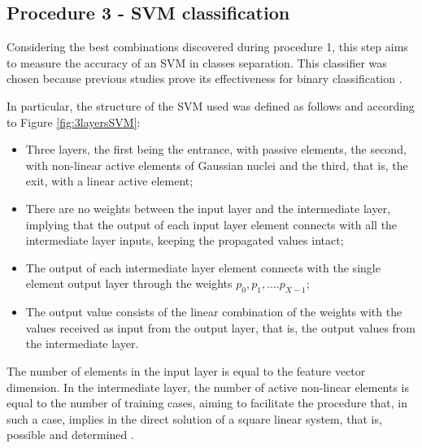 		\subsection{Procedure 3 - SVM classification}
			\label{sec:propApproach:subsec:Experiment3}

			\par Considering the best combinations discovered during procedure 1, this step aims to measure the accuracy of an SVM in classes separation. This classifier was chosen because previous studies prove its effectiveness for binary classification \cite{bennett2000support}.\\
			
			\par In particular, the structure of the SVM used was defined as follows and according to Figure \ref{fig:3layersSVM}:\\
			\begin{itemize}
				\item Three layers, the first being the entrance, with passive elements, the second, with non-linear active elements of Gaussian nuclei and the third, that is, the exit, with a linear active element;

				\item There are no weights between the input layer and the intermediate layer, implying that the output of each input layer element connects with all the intermediate layer inputs, keeping the propagated values intact;
				
				\item The output of each intermediate layer element connects with the single element output layer through the weights $p_0, p_1, .... p_{X-1}$;

				\item The output value consists of the linear combination of the weights with the values received as input from the output layer, that is, the output values from the intermediate layer.
			\end{itemize}
			
			
			
			\par The number of elements in the input layer is equal to the feature vector dimension. In the intermediate layer, the number of active non-linear elements is equal to the number of training cases, aiming to facilitate the procedure that, in such a case, implies in the direct solution of a square linear system, that is, possible and determined \cite{poole2014linear}. \\
			
